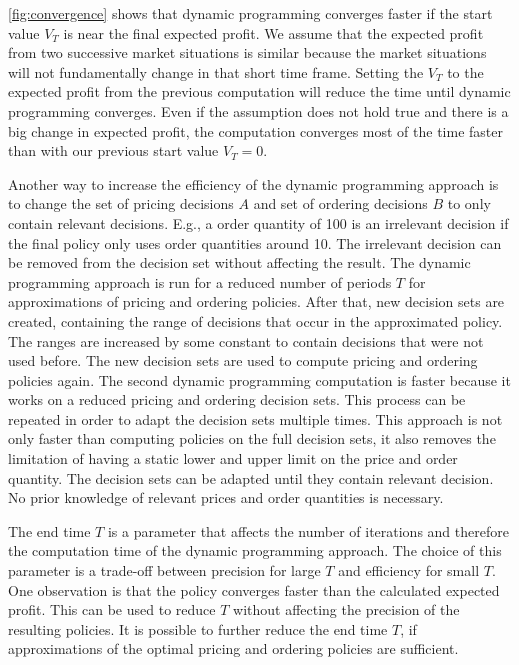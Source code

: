 \cref{fig:convergence} shows that dynamic programming converges faster if the start value $V_T$ is near the final expected profit.
We assume that the expected profit from two successive market situations is similar because the market situations will not fundamentally change in that short time frame.
Setting the $V_T$ to the expected profit from the previous computation will reduce the time until dynamic programming converges.
Even if the assumption does not hold true and there is a big change in expected profit, the computation converges most of the time faster than with our previous start value $V_T = 0$.

Another way to increase the efficiency of the dynamic programming approach is to change the set of pricing decisions $A$ and set of ordering decisions $B$ to only contain relevant decisions.
E.g., a order quantity of 100 is an irrelevant decision if the final policy only uses order quantities around 10.
The irrelevant decision can be removed from the decision set without affecting the result.
The dynamic programming approach is run for a reduced number of periods $T$ for approximations of pricing and ordering policies.
After that, new decision sets are created, containing the range of decisions that occur in the approximated policy.
The ranges are increased by some constant to contain decisions that were not used before.
The new decision sets are used to compute pricing and ordering policies again.
The second dynamic programming computation is faster because it works on a reduced pricing and ordering decision sets.
This process can be repeated in order to adapt the decision sets multiple times.
This approach is not only faster than computing policies on the full decision sets, it also removes the limitation of having a static lower and upper limit on the price and order quantity.
The decision sets can be adapted until they contain relevant decision.
No prior knowledge of relevant prices and order quantities is necessary.

The end time $T$ is a parameter that affects the number of iterations and therefore the computation time of the dynamic programming approach.
The choice of this parameter is a trade-off between precision for large $T$ and efficiency for small $T$.
One observation is that the policy converges faster than the calculated expected profit.
This can be used to reduce $T$ without affecting the precision of the resulting policies.
It is possible to further reduce the end time $T$, if approximations of the optimal pricing and ordering policies are sufficient.

